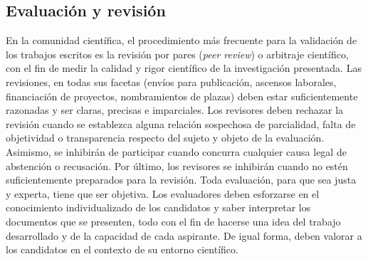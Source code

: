 \subsection{Evaluación y revisión}
En la comunidad científica, el procedimiento más frecuente para la validación de los trabajos
escritos es la revisión por pares (\textit{peer review}) o arbitraje científico, con el fin 
de medir la calidad y rigor científico de la investigación presentada.
Las revisiones, en todas sus facetas (envíos para publicación, ascensos laborales, financiación de
proyectos, nombramientos de plazas) deben estar suficientemente razonadas y ser claras, precisas
e imparciales. Los revisores deben rechazar la revisión cuando se establezca alguna relación sospechosa de
parcialidad, falta de objetividad o transparencia respecto del sujeto y objeto de la evaluación.
Asimismo, se inhibirán de participar cuando concurra cualquier causa legal de abstención o
recusación. Por último, los revisores se inhibirán cuando no estén suficientemente preparados para
la revisión. Toda evaluación, para que sea justa y experta, tiene que ser objetiva. Los evaluadores deben
esforzarse en el conocimiento individualizado de los candidatos y saber interpretar los documentos
que se presenten, todo con el fin de hacerse una idea del trabajo desarrollado y de
la capacidad de cada aspirante. De igual forma, deben valorar a los candidatos en el contexto de su
entorno científico.